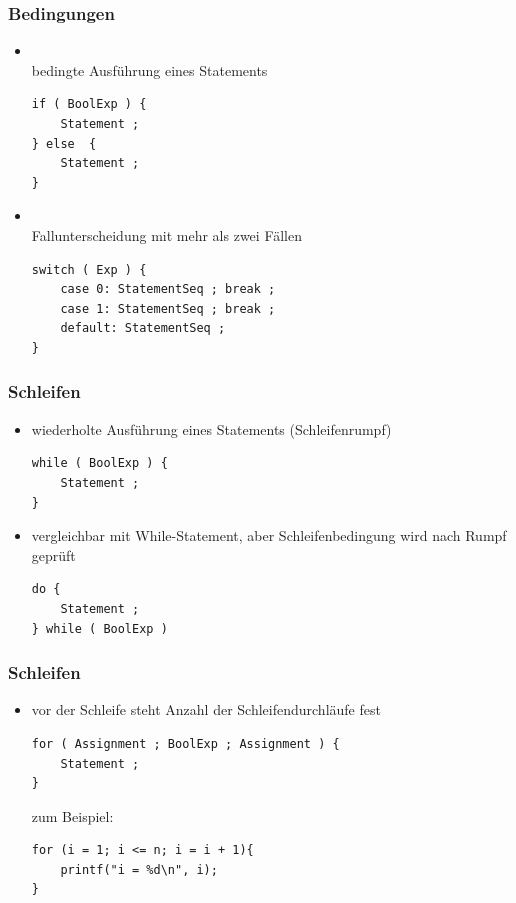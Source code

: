 \documentclass{beamer}
\begin{document}

\begin{frame}[fragile] \frametitle{Bedingungen}
	\small
	\begin{itemize}
		\item {} \\
		bedingte Ausführung eines Statements
\begin{lstlisting}[style=example]
if ( BoolExp ) {
	Statement ;
} else  {
	Statement ;
}
\end{lstlisting}
		\item {} \\
		Fallunterscheidung mit mehr als zwei Fällen
\begin{lstlisting}[style=example]
switch ( Exp ) {
	case 0: StatementSeq ; break ;
	case 1: StatementSeq ; break ;
	default: StatementSeq ;
}
\end{lstlisting}
	\end{itemize}
\end{frame}


\begin{frame}[fragile] \frametitle{Schleifen}
	\begin{itemize}
		\item {} wiederholte Ausführung eines Statements (Schleifenrumpf)
\begin{lstlisting}[style=example]
while ( BoolExp ) {
	Statement ;
}
\end{lstlisting}
		\item {} vergleichbar mit While-Statement, aber Schleifenbedingung wird nach Rumpf geprüft
\begin{lstlisting}[style=example]
do {
	Statement ;
} while ( BoolExp )
\end{lstlisting}

	\end{itemize}
\end{frame}


\begin{frame}[fragile] \frametitle{Schleifen}
	\begin{itemize}
		\item {} vor der Schleife steht Anzahl der Schleifendurchläufe fest
\begin{lstlisting}[style=example]
for ( Assignment ; BoolExp ; Assignment ) {
	Statement ;
}
\end{lstlisting}	
	zum Beispiel:
\begin{lstlisting}[style=example]
for (i = 1; i <= n; i = i + 1){
	printf("i = %d\n", i);
}
\end{lstlisting}	
	\end{itemize}
\end{frame}
\end{document}
